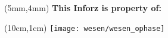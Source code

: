 \thispagestyle{empty}

\begin{textblock*}{10cm}(5mm,4mm)
    \normalsize \textbf{This Inforz is property of:}
\end{textblock*}

\begin{textblock*}{4cm}(10cm,1cm)
    \texttt{[image: wesen/wesen\_ophase]}
\end{textblock*}
